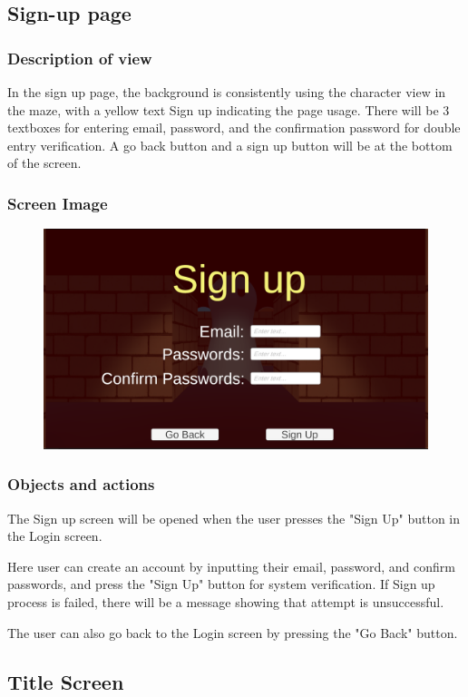 \documentclass[11pt]{article}
\begin{document}
\subsection{Sign-up page}
\subsubsection{Description of view}
In the sign up page, the background is consistently using the character view in the maze, with a yellow text Sign up indicating the page usage. There will be 3 textboxes for entering email, password, and the confirmation password for double entry verification. A go back button and a sign up button will be at the bottom of the screen.
\subsubsection{Screen Image}
\begin{figure}[H]
    \centering
    \includegraphics*[scale=0.2]{UI0.1SignUp.png}
\end{figure}
\subsubsection{Objects and actions}
The Sign up screen will be opened when the user presses the "Sign Up" button in the Login screen. 

Here user can create an account by inputting their email, password, and confirm passwords, and press the "Sign Up" button for system verification. If Sign up process is failed, there will be a message showing that attempt is unsuccessful.

The user can also go back to the Login screen by pressing the "Go Back" button.

\subsection{Title Screen}
\end{document}
